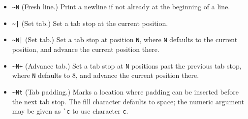\begin{description}
\begin{itemize}
\item \verb|~N|
(Fresh line.) Print a newline if not already at the beginning of a line.

\item \verb+~|+
(Set tab.) Set a tab stop at the current position.

\item \verb+~N|+
(Set tab.) Set a tab stop at position {\tt N}, where {\tt N} defaults to
the current position, and advance the current position there.

\item \verb|~N+|
(Advance tab.) Set a tab stop at {\tt N} positions past the previous
tab stop, where {\tt N} defaults to 8, and advance the current position
there.

\item \verb|~Nt|
(Tab padding.) Marks a location where padding can be inserted before the
next tab stop.  The fill character defaults to space; the numeric argument
may be given as \verb|`c| to use character {\tt c}.

\end{itemize}
\end{description}


